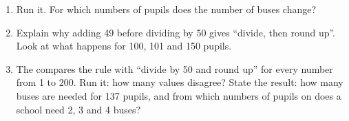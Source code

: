 \begin{problem}
\label{lst:g6:first-python-program:buses-table}

\begin{enumerate}[resume]
  \item Run it. For which numbers of pupils does the number of buses change?
  \item Explain why adding 49 before dividing by 50 gives ``divide, then round
    up''. Look at what happens for 100, 101 and 150 pupils.
  \item The   compares the rule with ``divide by 50
    and round up'' for every number from 1 to 200. Run it: how many values
    disagree? State the result: how many buses are needed for 137 pupils, and
    from which numbers of pupils on does a school need 2, 3 and 4 buses?
\end{enumerate}
\end{problem}
